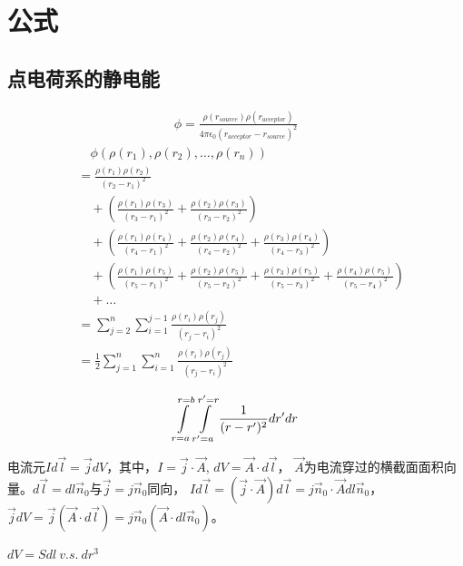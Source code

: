 \section{公式}

\subsection{点电荷系的静电能}
\begin{align}
    \phi =\frac{\rho(r_{source})\rho(r_{acceptor})}{4\pi \epsilon_0(r_{acceptor}-r_{source})^{2}}
\end{align}
\begin{equation}
    \begin{split}
    &\quad \phi(\rho(r_{1}),\rho(r_{2}),\dots,\rho(r_{n}))\\
    &=\frac{\rho(r_{1})\rho(r_{2})}{(r_{2}-r_{1})^{2}}\\
    &\quad +(\frac{\rho(r_{1})\rho(r_{3})}{(r_{3}-r_{1})^{2}}+\frac{\rho(r_{2})\rho(r_{3})}{(r_{3}-r_{2})^{2}})\\
    &\quad +(\frac{\rho(r_{1})\rho(r_{4})}{(r_{4}-r_{1})^{2}}+\frac{\rho(r_{2})\rho(r_{4})}{(r_{4}-r_{2})^{2}}+\frac{\rho(r_{3})\rho(r_{4})}{(r_{4}-r_{3})^{2}})\\
    &\quad +(\frac{\rho(r_{1})\rho(r_{5})}{(r_{5}-r_{1})^{2}}+\frac{\rho(r_{2})\rho(r_{5})}{(r_{5}-r_{2})^{2}}+\frac{\rho(r_{3})\rho(r_{5})}{(r_{5}-r_{3})^{2}}+\frac{\rho(r_{4})\rho(r_{5})}{(r_{5}-r_{4})^{2}})\\
    &\quad +\dots \\
    &=\sum_{j=2}^{n}\sum_{i=1}^{j-1}\frac{\rho(r_{i})\rho(r_{j})}{(r_{j}-r_{i})^{2}}\\
    &=\frac{1}{2}\sum_{j=1}^{n}\sum_{i=1}^{n}\frac{\rho(r_{i})\rho(r_{j})}{(r_{j}-r_{i})^{2}}\\
    \end{split}
\end{equation}
\begin{align}
    \intop_{r=a}^{r=b}{\intop_{r'=a}^{r'=r}{\frac{1}{(r-r')^{2}}dr'dr}}
\end{align}

电流元$Id\vec{l}=\vec{j}dV$，其中，$I=\vec{j}\cdot \vec{A}$, $dV=\vec{A}\cdot d\vec{l}$，
$\vec{A}$为电流穿过的横截面面积向量。$d\vec{l}=dl\vec{n}_{0}$与$\vec{j}=j\vec{n}_{0}$同向，
$Id\vec{l}=(\vec{j}\cdot \vec{A})d\vec{l}=j\vec{n}_{0}\cdot \vec{A}dl\vec{n}_{0}$，
$\vec{j}dV=\vec{j}(\vec{A}\cdot d\vec{l})=j\vec{n}_{0}(\vec{A}\cdot dl\vec{n}_{0})$。

\par
$dV=Sdl\ v.s.\ dr^{3}$


